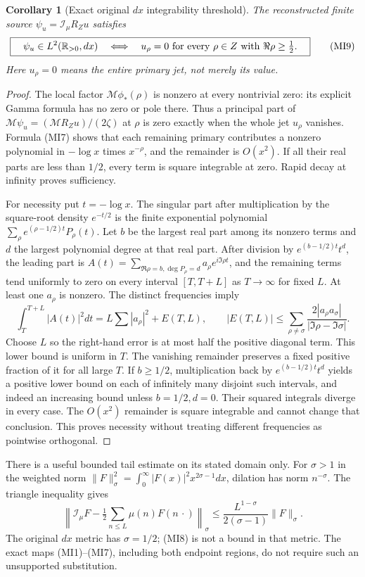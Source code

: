 \documentclass[11pt]{article}
\newtheorem{corollary}[theorem]{Corollary}
\begin{document}
\begin{corollary}[Exact original $dx$ integrability threshold]
The reconstructed finite source $\psi_u=\mathcal I_\mu R_Zu$
satisfies
\[
 \boxed{\quad\psi_u\in L^2(\mathbb R_{>0},dx)
 \quad\Longleftrightarrow\quad
 u_\rho=0\ \text{for every }\rho\in Z\text{ with }
                         \Re\rho\geq\tfrac12.\quad}\tag{MI9}
\]
Here $u_\rho=0$ means the entire primary jet, not merely its value.
\end{corollary}
\begin{proof}
The local factor $\mathcal M\phi_*(\rho)$ is nonzero at every
nontrivial zero: its explicit Gamma formula has no zero or pole
there. Thus a principal part of
$\mathcal M\psi_u=(\mathcal MR_Zu)/(2\zeta)$ at $\rho$ is zero
exactly when the whole jet $u_\rho$ vanishes. Formula (MI7) shows
that each remaining primary contributes a nonzero polynomial in
$-\log x$ times $x^{-\rho}$, and the remainder is $O(x^2)$.
If all their real parts are less than $1/2$, every term is square
integrable at zero. Rapid decay at infinity proves sufficiency.

For necessity put $t=-\log x$. The singular part after multiplication
by the square-root density $e^{-t/2}$ is the finite exponential
polynomial $\sum_\rho e^{(\rho-1/2)t}P_\rho(t)$.
Let $b$ be the largest real part among its nonzero terms and $d$
the largest polynomial degree at that real part. After division by
$e^{(b-1/2)t}t^d$, the leading part is
$A(t)=\sum_{\Re\rho=b,\deg P_\rho=d}a_\rho e^{i\Im\rho t}$,
and the remaining terms tend uniformly to zero on every interval
$[T,T+L]$ as $T\to\infty$ for fixed $L$. At least one $a_\rho$
is nonzero. The distinct frequencies imply
\[
 \int_T^{T+L}|A(t)|^2dt
 =L\sum|a_\rho|^2+E(T,L),\qquad
 |E(T,L)|\leq
  \sum_{\rho\ne\sigma}\frac{2|a_\rho a_\sigma|}
                                    {|\Im\rho-\Im\sigma|}.
\]
Choose $L$ so the right-hand error is at most half the positive
diagonal term. This lower bound is uniform in $T$. The vanishing
remainder preserves a fixed positive fraction of it for all large
$T$. If $b\geq1/2$, multiplication back by
$e^{(b-1/2)t}t^d$ yields a positive lower bound on each of infinitely
many disjoint such intervals, and indeed an increasing bound unless
$b=1/2,d=0$. Their squared integrals diverge in every case. The
$O(x^2)$ remainder is square integrable and cannot change that
conclusion. This proves necessity without treating different
frequencies as pointwise orthogonal.
\end{proof}

There is a useful bounded tail estimate on its stated domain only.
For $\sigma>1$ in the weighted norm
$\|F\|_\sigma^2=\int_0^\infty|F(x)|^2x^{2\sigma-1}dx$,
dilation has norm $n^{-\sigma}$. The triangle inequality gives
\[
 \left\|\mathcal I_\mu F-\tfrac12\sum_{n\leq L}\mu(n)F(n\,\cdot)
 \right\|_\sigma
 \leq\frac{L^{1-\sigma}}{2(\sigma-1)}\|F\|_\sigma.
 \tag{MI8}
\]
The original $dx$ metric has $\sigma=1/2$; (MI8) is not a bound
in that metric. The exact maps (MI1)--(MI7), including both endpoint
regions, do not require such an unsupported substitution.
\end{document}
